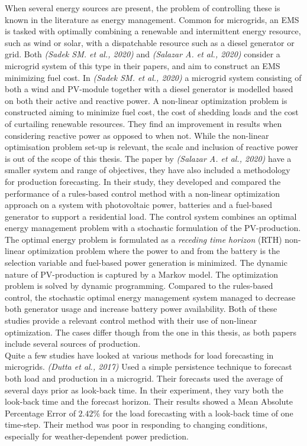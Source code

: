 When several energy sources are present, the problem of controlling these is known in the literature as energy management. Common for microgrids, an EMS is tasked with optimally combining a renewable and intermittent energy resource, such as wind or solar, with a dispatchable resource such as a diesel generator or grid. Both \textit{(Sadek SM. et al., 2020)} and \textit{(Salazar A. et al., 2020)} consider a microgrid system of this type in their papers, and aim to construct an EMS minimizing fuel cost. In \textit{(Sadek SM. et al., 2020)} a microgrid system consisting of both a wind and PV-module together with a diesel generator is modelled based on both their active and reactive power. A non-linear optimization problem is constructed aiming to minimize fuel cost, the cost of shedding loads and the cost of curtailing renewable resources. They find an improvement in results when considering reactive power as opposed to when not. While the non-linear optimisation problem set-up is relevant, the scale and inclusion of reactive power is out of the scope of this thesis.\cite{Sadek2020-wl}
The paper by \textit{(Salazar A. et al., 2020)} have a smaller system and range of objectives, they have also included a methodology for production forecasting. In their study, they developed and compared the performance of a rules-based control method with a non-linear optimization approach on a system with photovoltaic power, batteries and a fuel-based generator to support a residential load. The control system combines an optimal energy management problem with a stochastic formulation of the PV-production. The optimal energy problem is formulated as a \textit{receding time horizon} (RTH) non-linear optimization problem where the power to and from the battery is the selection variable and fuel-based power generation is minimized. The dynamic nature of PV-production is captured by a Markov model. The optimization problem is solved by dynamic programming. Compared to the rules-based control, the stochastic optimal energy management system managed to decrease both generator usage and increase battery power availability.\cite{Salazar2020-al}
Both of these studies provide a relevant control method with their use of non-linear optimization. The cases differ though from the one in this thesis, as both papers include several sources of production.\\  

Quite a few studies have looked at various methods for load forecasting in microgrids. \textit{(Dutta et al., 2017)} Used a simple persistence technique to forecast both load and production in a microgrid. Their forecasts used the average of several days prior as look-back time. In their experiment, they vary both the look-back time and the forecast horizon. Their results showed a Mean Absolute Percentage Error of $2.42\%$ for the load forecasting with a look-back time of one time-step. Their method was poor in responding to changing conditions, especially for weather-dependent power prediction.\cite{Dutta2017-oi}\\

